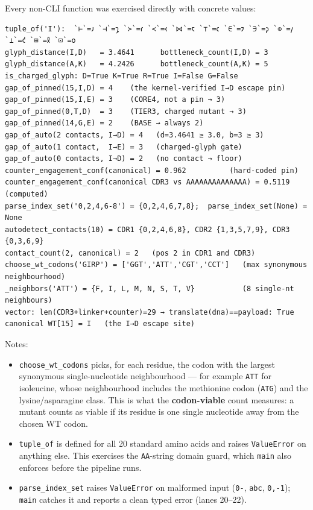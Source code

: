 \documentclass[12pt,a4paper]{article}
\providecommand{\tightlist}{%
  \setlength{\itemsep}{0pt}\setlength{\parskip}{0pt}%
}
\begin{document}
Every non-CLI function was exercised directly with concrete values:

\begin{verbatim}
tuple_of('I'):  `⊢`=𐑨 `⊣`=𐑡 `≻`=𐑩 `≺`=𐑬 `⋈`=𐑱 `⊤`=𐑤 `∈`=𐑲 `∋`=𐑜 `⊙`=𐑢 `⊥`=𐑒 `⊞`=𐑙 `⊡`=𐑴
glyph_distance(I,D)   = 3.4641      bottleneck_count(I,D) = 3
glyph_distance(A,K)   = 4.2426      bottleneck_count(A,K) = 5
is_charged_glyph: D=True K=True R=True I=False G=False
gap_of_pinned(15,I,D) = 4    (the kernel-verified I→D escape pin)
gap_of_pinned(15,I,E) = 3    (CORE4, not a pin → 3)
gap_of_pinned(0,T,D)  = 3    (TIER3, charged mutant → 3)
gap_of_pinned(14,G,E) = 2    (BASE → always 2)
gap_of_auto(2 contacts, I→D) = 4   (d=3.4641 ≥ 3.0, b=3 ≥ 3)
gap_of_auto(1 contact,  I→E) = 3   (charged-glyph gate)
gap_of_auto(0 contacts, I→D) = 2   (no contact → floor)
counter_engagement_conf(canonical) = 0.962          (hard-coded pin)
counter_engagement_conf(canonical CDR3 vs AAAAAAAAAAAAAA) = 0.5119  (computed)
parse_index_set('0,2,4,6-8') = {0,2,4,6,7,8};  parse_index_set(None) = None
autodetect_contacts(10) = CDR1 {0,2,4,6,8}, CDR2 {1,3,5,7,9}, CDR3 {0,3,6,9}
contact_count(2, canonical) = 2   (pos 2 in CDR1 and CDR3)
choose_wt_codons('GIRP') = ['GGT','ATT','CGT','CCT']   (max synonymous neighbourhood)
_neighbors('ATT') = {F, I, L, M, N, S, T, V}           (8 single-nt neighbours)
vector: len(CDR3+linker+counter)=29 → translate(dna)==payload: True
canonical WT[15] = I   (the I→D escape site)
\end{verbatim}

Notes:

\begin{itemize}
\tightlist
\item
  \texttt{choose\_wt\_codons} picks, for each residue, the codon with
  the largest synonymous single-nucleotide neighbourhood --- for example
  \texttt{ATT} for isoleucine, whose neighbourhood includes the
  methionine codon (\texttt{ATG}) and the lysine/asparagine class. This
  is what the \textbf{codon-viable} count measures: a mutant counts as
  viable if its residue is one single nucleotide away from the chosen WT
  codon.
\item
  \texttt{tuple\_of} is defined for all 20 standard amino acids and
  raises \texttt{ValueError} on anything else. This exercises the
  \texttt{AA}-string domain guard, which \texttt{main} also enforces
  before the pipeline runs.
\item
  \texttt{parse\_index\_set} raises \texttt{ValueError} on malformed
  input (\texttt{\textquotesingle{}0-\textquotesingle{}},
  \texttt{\textquotesingle{}abc\textquotesingle{}},
  \texttt{\textquotesingle{}0,-1\textquotesingle{}}); \texttt{main}
  catches it and reports a clean typed error (lanes 20--22).
\end{itemize}
\end{document}
